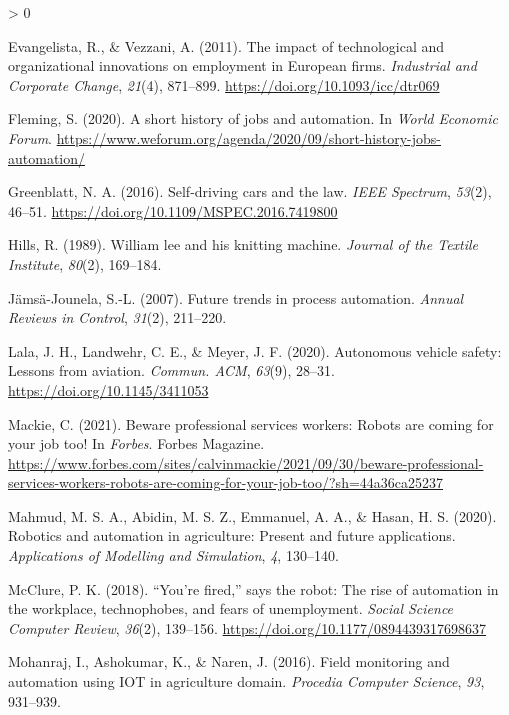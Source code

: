 \documentclass[
  english,
  man]{apa7}
\newlength{\cslhangindent}
\newenvironment{CSLReferences}[2] %
 {%
  \setlength{\parindent}{0pt}
  \ifodd #1 \everypar{\setlength{\hangindent}{\cslhangindent}}\ignorespaces\fi
  \ifnum #2 > 0
  \setlength{\parskip}{#2\baselineskip}
  \fi
 }%
 {}
\begin{document}
\begin{CSLReferences}{1}{0}
\leavevmode\hypertarget{ref-10.1093ux2ficcux2fdtr069}{}%
Evangelista, R., \& Vezzani, A. (2011). {The impact of technological and organizational innovations on employment in European firms}. \emph{Industrial and Corporate Change}, \emph{21}(4), 871--899. \url{https://doi.org/10.1093/icc/dtr069}

\leavevmode\hypertarget{ref-fleming_2020}{}%
Fleming, S. (2020). A short history of jobs and automation. In \emph{World Economic Forum}. \url{https://www.weforum.org/agenda/2020/09/short-history-jobs-automation/}

\leavevmode\hypertarget{ref-7419800}{}%
Greenblatt, N. A. (2016). Self-driving cars and the law. \emph{IEEE Spectrum}, \emph{53}(2), 46--51. \url{https://doi.org/10.1109/MSPEC.2016.7419800}

\leavevmode\hypertarget{ref-hills1989william}{}%
Hills, R. (1989). William lee and his knitting machine. \emph{Journal of the Textile Institute}, \emph{80}(2), 169--184.

\leavevmode\hypertarget{ref-jamsa2007future}{}%
Jämsä-Jounela, S.-L. (2007). Future trends in process automation. \emph{Annual Reviews in Control}, \emph{31}(2), 211--220.

\leavevmode\hypertarget{ref-10.1145ux2f3411053}{}%
Lala, J. H., Landwehr, C. E., \& Meyer, J. F. (2020). Autonomous vehicle safety: Lessons from aviation. \emph{Commun. ACM}, \emph{63}(9), 28--31. \url{https://doi.org/10.1145/3411053}

\leavevmode\hypertarget{ref-mackie_2021}{}%
Mackie, C. (2021). Beware professional services workers: Robots are coming for your job too! In \emph{Forbes}. Forbes Magazine. \url{https://www.forbes.com/sites/calvinmackie/2021/09/30/beware-professional-services-workers-robots-are-coming-for-your-job-too/?sh=44a36ca25237}

\leavevmode\hypertarget{ref-mahmud2020robotics}{}%
Mahmud, M. S. A., Abidin, M. S. Z., Emmanuel, A. A., \& Hasan, H. S. (2020). Robotics and automation in agriculture: Present and future applications. \emph{Applications of Modelling and Simulation}, \emph{4}, 130--140.

\leavevmode\hypertarget{ref-PaulKMcclure2018}{}%
McClure, P. K. (2018). {``You're fired,''} says the robot: The rise of automation in the workplace, technophobes, and fears of unemployment. \emph{Social Science Computer Review}, \emph{36}(2), 139--156. \url{https://doi.org/10.1177/0894439317698637}

\leavevmode\hypertarget{ref-mohanraj2016field}{}%
Mohanraj, I., Ashokumar, K., \& Naren, J. (2016). Field monitoring and automation using IOT in agriculture domain. \emph{Procedia Computer Science}, \emph{93}, 931--939.


\end{CSLReferences}
\end{document}
